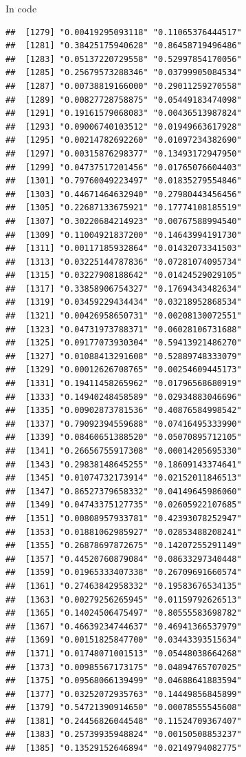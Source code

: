 \documentclass[ignorenonframetext,]{beamer}
\begin{document}
\begin{frame}[fragile]{In code}
\begin{verbatim}
##  [1279] "0.00419295093118" "0.11065376444517"
##  [1281] "0.38425175940628" "0.86458719496486"
##  [1283] "0.05137220729558" "0.52997854170056"
##  [1285] "0.25679573288346" "0.03799905084534"
##  [1287] "0.00738819166000" "0.29011259270558"
##  [1289] "0.00827728758875" "0.05449183474098"
##  [1291] "0.19161579068083" "0.00436513987824"
##  [1293] "0.09006740103512" "0.01949663617928"
##  [1295] "0.00214782692260" "0.01097234382690"
##  [1297] "0.00315876298377" "0.13493172947950"
##  [1299] "0.04737517201456" "0.01765076604403"
##  [1301] "0.79760049223497" "0.01835279554846"
##  [1303] "0.44671464632940" "0.27980443456456"
##  [1305] "0.22687133675921" "0.17774108185519"
##  [1307] "0.30220684214923" "0.00767588994540"
##  [1309] "0.11004921837200" "0.14643994191730"
##  [1311] "0.00117185932864" "0.01432073341503"
##  [1313] "0.03225144787836" "0.07281074095734"
##  [1315] "0.03227908188642" "0.01424529029105"
##  [1317] "0.33858906754327" "0.17694343482634"
##  [1319] "0.03459229434434" "0.03218952868534"
##  [1321] "0.00426958650731" "0.00208130072551"
##  [1323] "0.04731973788371" "0.06028106731688"
##  [1325] "0.09177073930304" "0.59413921486270"
##  [1327] "0.01088413291608" "0.52889748333079"
##  [1329] "0.00012626708765" "0.00254609445173"
##  [1331] "0.19411458265962" "0.01796568680919"
##  [1333] "0.14940248458589" "0.02934883046696"
##  [1335] "0.00902873781536" "0.40876584998542"
##  [1337] "0.79092394559688" "0.07416495333990"
##  [1339] "0.08460651388520" "0.05070895712105"
##  [1341] "0.26656755917308" "0.00014205695330"
##  [1343] "0.29838148645255" "0.18609143374641"
##  [1345] "0.01074732173914" "0.02152011846513"
##  [1347] "0.86527379658332" "0.04149645986060"
##  [1349] "0.04743375127735" "0.02605922107685"
##  [1351] "0.00808957933781" "0.42393078252947"
##  [1353] "0.01881062985927" "0.02853488208241"
##  [1355] "0.26878697872675" "0.14207255291149"
##  [1357] "0.44520760879084" "0.08633297340448"
##  [1359] "0.01965333407338" "0.26709691660574"
##  [1361] "0.27463842958332" "0.19583676534135"
##  [1363] "0.00279256265945" "0.01159792626513"
##  [1365] "0.14024506475497" "0.80555583698782"
##  [1367] "0.46639234744637" "0.46941366537979"
##  [1369] "0.00151825847700" "0.03443393515634"
##  [1371] "0.01748071001513" "0.05448038664268"
##  [1373] "0.00985567173175" "0.04894765707025"
##  [1375] "0.09568066139499" "0.04688641883594"
##  [1377] "0.03252072935763" "0.14449856845899"
##  [1379] "0.54721390914650" "0.00078555545608"
##  [1381] "0.24456826044548" "0.11524709367407"
##  [1383] "0.25739935948824" "0.00150508853237"
##  [1385] "0.13529152646894" "0.02149794082775"

\end{verbatim}
\end{frame}
\end{document}
